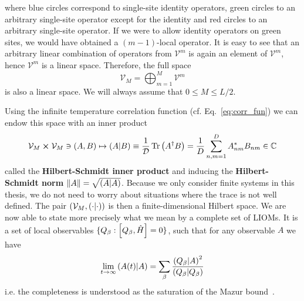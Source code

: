 where blue circles correspond to single-site identity operators, green circles to an arbitrary
single-site operator except for the identity and red circles to an arbitrary single-site operator.
If we were to allow identity operators on green sites, we would have obtained a \((m-1)\)-local operator.
It is easy to see that an arbitrary linear combination of operators from \(\mathcal{V}^m\) is again
an element of \(\mathcal{V}^m\), hence \(\mathcal{V}^m\) is a linear space. Therefore,
the full space
\begin{equation}
  \mathcal{V}_{M} = \bigoplus_{m=1}^{M} \mathcal{V}^m
\end{equation}
is also a linear space. We will always assume that \(0\leq M \leq L/2\).

Using the infinite temperature correlation function (cf. Eq.~\eqref{eq:corr_fun}) we can endow this space with an inner product
\begin{equation}
  \mathcal{V}_M \cross \mathcal{V}_M \ni (A, B) \mapsto \left(A \middle| B\right)
  \equiv \frac{1}{\mathcal{D}}\Tr\left(A^{\dagger} B\right) = \frac{1}{D}\sum_{n,m = 1}^{D} A_{nm}^{\ast} B_{nm} \in \mathbb{C}
  \label{eq:hs_prod}
\end{equation}
called the \textbf{Hilbert-Schmidt inner product} and
inducing the \textbf{Hilbert-Schmidt norm} \(\norm{A} = \sqrt{\left(A \middle| A\right)}\).
Because we only consider finite systems in this thesis, we do not need to worry about
situations where the trace is not well defined. The pair \( (\mathcal{V}_M, \left(\cdot \middle| \cdot\right)) \)
is then a finite-dimensional Hilbert space.
We are now able to state more precisely what we mean by a complete set of LIOMs.
It is a set of local observables \(\{Q_{\beta} : \comm{Q_{\beta}}{\hat{H} } = 0\}\), such that
for any observable \(A\) we have
\begin{equation}
  \lim_{t\to\infty} \left(A(t) \middle| A\right) = \sum_{\beta} \frac{\left(Q_{\beta} \middle| A\right)^2}{\left(Q_{\beta} \middle| Q_{\beta}\right)}
\end{equation}
i.e. the completeness is understood as the saturation of the Mazur bound~\autocite{Mazur1969}.

